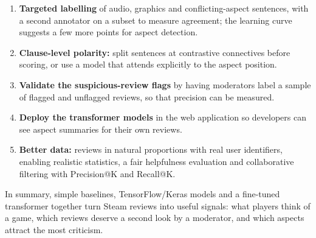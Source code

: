 \begin{enumerate}
    \item \textbf{Targeted labelling} of audio, graphics and conflicting-aspect sentences, with a second annotator on a subset to measure agreement; the learning curve suggests a few more points for aspect detection.
    \item \textbf{Clause-level polarity:} split sentences at contrastive connectives before scoring, or use a model that attends explicitly to the aspect position.
    \item \textbf{Validate the suspicious-review flags} by having moderators label a sample of flagged and unflagged reviews, so that precision can be measured.
    \item \textbf{Deploy the transformer models} in the web application so developers can see aspect summaries for their own reviews.
    \item \textbf{Better data:} reviews in natural proportions with real user identifiers, enabling realistic statistics, a fair helpfulness evaluation and collaborative filtering with Precision@K and Recall@K.
\end{enumerate}

In summary, simple baselines, TensorFlow/Keras models and a fine-tuned transformer together turn Steam reviews into useful signals: what players think of a game, which reviews deserve a second look by a moderator, and which aspects attract the most criticism.

